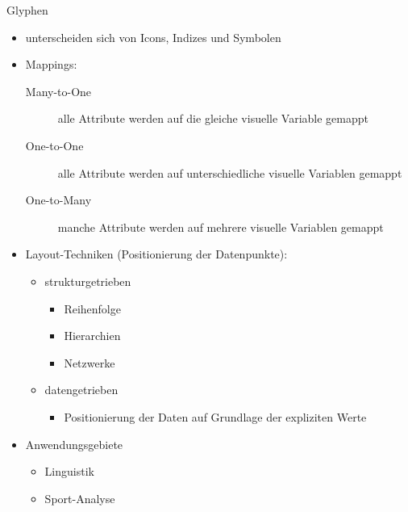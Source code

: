 \begin{TOP}{Glyphen}
\vspace*{-1.5\baselineskip}
\begin{itemize}
	\item unterscheiden sich von Icons, Indizes und Symbolen
	\item Mappings:
		\begin{description}
			\item[Many-to-One] alle Attribute werden auf die gleiche visuelle Variable gemappt
			\item[One-to-One] alle Attribute werden auf unterschiedliche visuelle Variablen gemappt
			\item[One-to-Many] manche Attribute werden auf mehrere visuelle Variablen gemappt
		\end{description}
	\item Layout-Techniken (Positionierung der Datenpunkte):
		\begin{itemize}
			\item strukturgetrieben
				\begin{itemize}
					\item Reihenfolge
					\item Hierarchien
					\item Netzwerke
				\end{itemize}
			\item datengetrieben
				\begin{itemize}
					\item Positionierung der Daten auf Grundlage der expliziten Werte
				\end{itemize}
		\end{itemize}
	\item Anwendungsgebiete
		\begin{itemize}
			\item Linguistik
			\item Sport-Analyse
		\end{itemize}
\end{itemize}
\end{TOP}